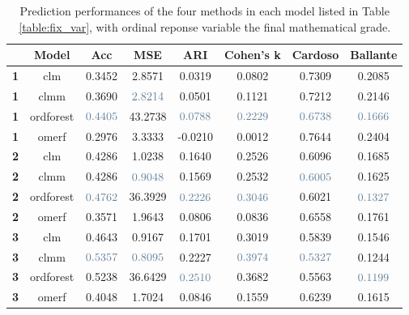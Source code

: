 \begin{table}[H]
    \centering 
    \begin{tabular}{|p{1em} c c c c c c c |}
    \hline
    \rowcolor{bluePoli!40}
    & \textbf{Model} & \textbf{Acc} & \textbf{MSE} & \textbf{ARI} & \textbf{Cohen's k} & \textbf{Cardoso} & \textbf{Ballante} \T\B \\
    \hline \hline
    \textbf{1} & clm & 0.3452 & 2.8571 & 0.0319 & 0.0802 & 0.7309 & 0.2085 \T\B \\
    \textbf{1} & clmm & 0.3690  & $\textcolor{bluePoli}{2.8214}$ & 0.0501 & 0.1121 & 0.7212 & 0.2146 \T\B \\
    \textbf{1} & ordforest & $\textcolor{bluePoli}{0.4405}$ & 43.2738 & $\textcolor{bluePoli}{0.0788}$ & $\textcolor{bluePoli}{0.2229}$ & $\textcolor{bluePoli}{0.6738}$ & $\textcolor{bluePoli}{0.1666}$ \T\B \\
    \textbf{1} & omerf & 0.2976 & 3.3333 & -0.0210 & 0.0012 & 0.7644 & 0.2404 \T\B \\
    \hline
    \textbf{2} & clm & 0.4286 & 1.0238 & 0.1640 & 0.2526 & 0.6096 & 0.1685 \T\B \\
    \textbf{2} & clmm & 0.4286  & $\textcolor{bluePoli}{0.9048}$ & 0.1569 & 0.2532 & $\textcolor{bluePoli}{0.6005}$ & 0.1625 \T\B \\
    \textbf{2} & ordforest & $\textcolor{bluePoli}{0.4762}$ & 36.3929 & $\textcolor{bluePoli}{0.2226}$ & $\textcolor{bluePoli}{0.3046}$ & 0.6021 & $\textcolor{bluePoli}{0.1327}$ \T\B \\
    \textbf{2} & omerf & 0.3571 & 1.9643 & 0.0806 & 0.0836 & 0.6558 & 0.1761 \T\B \\
    \hline
    \textbf{3} & clm & 0.4643 & 0.9167 & 0.1701 & 0.3019 & 0.5839 & 0.1546 \T\B \\
    \textbf{3} & clmm & $\textcolor{bluePoli}{0.5357}$  & $\textcolor{bluePoli}{0.8095}$ & 0.2227 & $\textcolor{bluePoli}{0.3974}$ & $\textcolor{bluePoli}{0.5327}$ & 0.1244 \T\B \\
    \textbf{3} & ordforest & 0.5238 & 36.6429  & $\textcolor{bluePoli}{0.2510}$ & 0.3682 & 0.5563  & $\textcolor{bluePoli}{0.1199}$ \T\B \\
    \textbf{3} & omerf & 0.4048 & 1.7024 & 0.0846 & 0.1559 & 0.6239 & 0.1615 \B \\
    \hline
    \end{tabular}
    \\[10pt]
    \caption{Prediction performances of the four methods in each model listed in Table \ref{table:fix_var}, with ordinal reponse variable the final mathematical grade.}
    \label{table:res_math}
\end{table}


